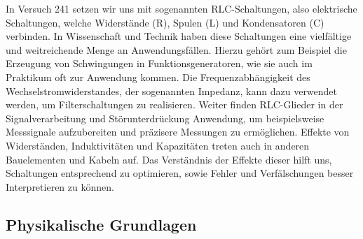 In Versuch 241 setzen wir uns mit sogenannten RLC-Schaltungen, also elektrische Schaltungen, welche Widerstände (R), Spulen (L) und Kondensatoren (C) verbinden. In Wissenschaft und Technik haben diese Schaltungen eine vielfältige und weitreichende Menge an Anwendungsfällen. Hierzu gehört zum Beispiel die Erzeugung von Schwingungen in Funktionsgeneratoren, wie sie auch im Praktikum oft zur Anwendung kommen. Die Frequenzabhängigkeit des Wechselstromwiderstandes, der sogenannten Impedanz, kann dazu verwendet werden, um Filterschaltungen zu realisieren. Weiter finden RLC-Glieder in der Signalverarbeitung und Störunterdrückung Anwendung, um beispielsweise Messsignale aufzubereiten und präzisere Messungen zu ermöglichen. Effekte von Widerständen, Induktivitäten und Kapazitäten treten auch in anderen Bauelementen und Kabeln auf. Das Verständnis der Effekte dieser hilft uns, Schaltungen entsprechend zu optimieren, sowie Fehler und Verfälschungen besser Interpretieren zu können.

\subsection{Physikalische Grundlagen}

